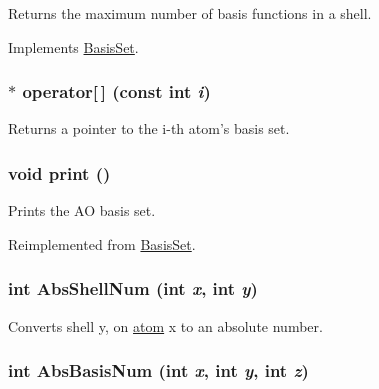 Returns the maximum number of basis functions in a shell. 

Implements \hyperlink{classJKBuilder_1_1BasisSet_a7c12871050e478f6a22c4c1c46bd4b21}{BasisSet}.\hypertarget{classJKBuilder_1_1AOBasisSet_a1d366290bc84106b0a92c61156a4fa80}{
\subsubsection[{operator[]}]{ $\ast$ operator\mbox{[}$\,$\mbox{]} (const int {\em i})}}
\label{classJKBuilder_1_1AOBasisSet_a1d366290bc84106b0a92c61156a4fa80}


Returns a pointer to the i-\/th atom's basis set. \hypertarget{classJKBuilder_1_1AOBasisSet_a388f572c62279f839ee138a9afbdeeb5}{
\subsubsection[{print}]{\setlength{\rightskip}{0pt plus 5cm}void print ()}}
\label{classJKBuilder_1_1AOBasisSet_a388f572c62279f839ee138a9afbdeeb5}


Prints the AO basis set. 

Reimplemented from \hyperlink{classJKBuilder_1_1BasisSet_a388f572c62279f839ee138a9afbdeeb5}{BasisSet}.\hypertarget{classJKBuilder_1_1AOBasisSet_aa1fc6892f227f640de8bc2d6aa127d5f}{
\subsubsection[{AbsShellNum}]{\setlength{\rightskip}{0pt plus 5cm}int AbsShellNum (int {\em x}, \/  int {\em y})}}
\label{classJKBuilder_1_1AOBasisSet_aa1fc6892f227f640de8bc2d6aa127d5f}


Converts shell y, on \hyperlink{classJKBuilder_1_1atom}{atom} x to an absolute number. \hypertarget{classJKBuilder_1_1AOBasisSet_a23219e59060d6ef915e6146114f52ddd}{
\subsubsection[{AbsBasisNum}]{\setlength{\rightskip}{0pt plus 5cm}int AbsBasisNum (int {\em x}, \/  int {\em y}, \/  int {\em z})}}
\label{classJKBuilder_1_1AOBasisSet_a23219e59060d6ef915e6146114f52ddd}


